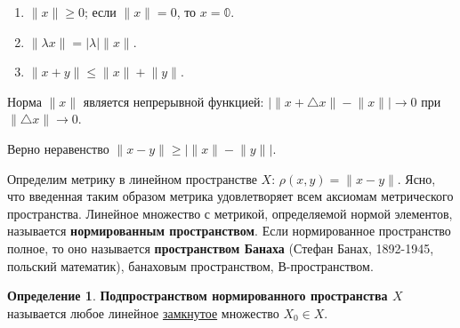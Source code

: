 \documentclass[12pt,a4paper,titlepage,oneside]{book}
\theoremstyle{definition}
\newtheorem*{definition}{Определение}
\theoremstyle{plain}
\theoremstyle{break}
\theoremstyle{remark}
\theoremstyle{remark}
\theoremstyle{remark}
\theoremstyle{remark}
\theoremstyle{plain}
\theoremstyle{plain}
\begin{document}
\begin{enumerate}

	\item $\lVert x\rVert \geqslant 0$; если $\lVert x\rVert = 0$, то $x=\mathbb{0}$.

	\item $\lVert \lambda x \rVert = \lvert \lambda \rvert \lVert x \rVert$.

	\item $\lVert x+y \rVert\leq\lVert x \rVert + \lVert y \rVert$.

\end{enumerate}

Норма $\lVert x\rVert$ является непрерывной функцией: $\lvert\lVert x+\triangle x\rVert-\lVert x\rVert\rvert\to0$ при $\lVert\triangle x\rVert\to0$.

Верно неравенство $\lVert x-y\rVert \geqslant \lvert\lVert x\rVert-\lVert y\rVert\rvert$.

Определим метрику в линейном пространстве $X$: $\rho(x,y)=\lVert x-y\rVert$. Ясно, что введенная таким образом метрика удовлетворяет всем аксиомам метрического пространства. Линейное множество с метрикой, определяемой нормой элементов, называется \textbf{нормированным пространством}. Если нормированное пространство полное, то оно называется \textbf{пространством Банаха} (Стефан Банах, 1892-1945, польский математик), банаховым пространством, В-пространством.

\begin{definition}
\textbf{Подпространством нормированного пространства $X$} называется любое линейное \underline{замкнутое} множество $X_0 \in X$.
\end{definition}
\end{document}

